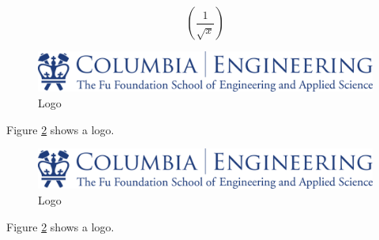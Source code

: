 \documentclass{article}
\begin{document}
\begin{equation*}
    \left(
        \frac{1}{\sqrt{x}}
    \right)
\end{equation*}


\newpage


\begin{figure}
    \includegraphics[width=\linewidth]{NewEngineeringDkBlue.png}
    \caption{Logo}
    \label{fig:logo1}
\end{figure}
Figure \ref{fig:logo1} shows a logo.

\begin{figure}[h!]
    \includegraphics[width=\linewidth]{NewEngineeringDkBlue.png}
    \caption{Logo}
    \label{fig:logo1}
\end{figure}
Figure \ref{fig:logo1} shows a logo.
\end{document}
